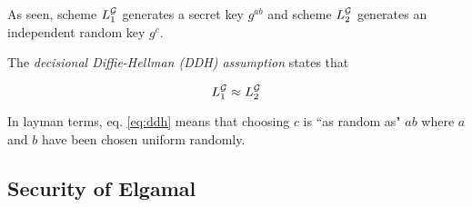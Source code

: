 As seen, scheme \( L_1^{\mathcal{G}} \) generates a secret key \( g^{ab} \) and scheme \( L_2^{\mathcal{G}} \) generates an independent random key \( g^c \).

The \textit{decisional Diffie-Hellman (DDH) assumption} states that

\begin{equation} \label{eq:ddh} 
    L_1^{\mathcal{G}} \approx L_2^{\mathcal{G}}
\end{equation}

In layman terms, eq. \ref{eq:ddh} means that choosing \( c \) is ``as random as" \( ab \) where \( a \) and \( b \) have been chosen uniform randomly.

\subsection{Security of Elgamal}
